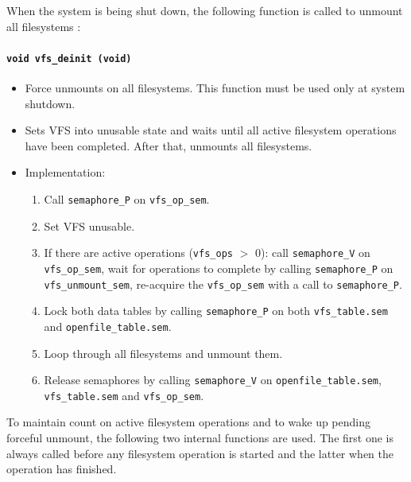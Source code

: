 \documentclass[twoside,a4paper]{report}
\makeatletter
\newenvironment{function}[3]{%
\paragraph{\texttt{#1 {\textbf{#2}} (#3)}}%
\index{#2@\texttt{#2}}%
\begin{itemize}%
}{%
\end{itemize}%
}
\makeatother
\begin{document}
When the system is being shut down, the following function is called
to unmount all filesystems  :

\begin{function}{void}{vfs\_deinit}{void}

\item Force unmounts on all filesystems. This function must be used only
at system shutdown. 

\item Sets VFS into unusable state and waits until all active
filesystem operations have been completed. After that, unmounts all
filesystems.

\item Implementation:
\begin{enumerate}

\item Call \texttt{semaphore\_P} on \texttt{vfs\_op\_sem}.

\item Set VFS unusable.

\item If there are active operations (\texttt{vfs\_ops} $>$ 0): call
\texttt{semaphore\_V} on \texttt{vfs\_op\_sem}, wait for operations to
complete by calling \texttt{semaphore\_P} on
\texttt{vfs\_unmount\_sem}, re-acquire the \texttt{vfs\_op\_sem} with
a call to \texttt{semaphore\_P}.

\item Lock both data tables by calling \texttt{semaphore\_P} on both
\texttt{vfs\_table.sem} and \texttt{openfile\_table.sem}.

\item Loop through all filesystems and unmount them.

\item Release semaphores by calling \texttt{semaphore\_V} on
\texttt{openfile\_table.sem}, \texttt{vfs\_table.sem} and
\texttt{vfs\_op\_sem}.

\end{enumerate}
\end{function}

To maintain count on active filesystem operations and to wake up
pending forceful unmount, the following two internal functions are
used. The first one is always called before any filesystem operation
is started and the latter when the operation has finished.
\end{document}
